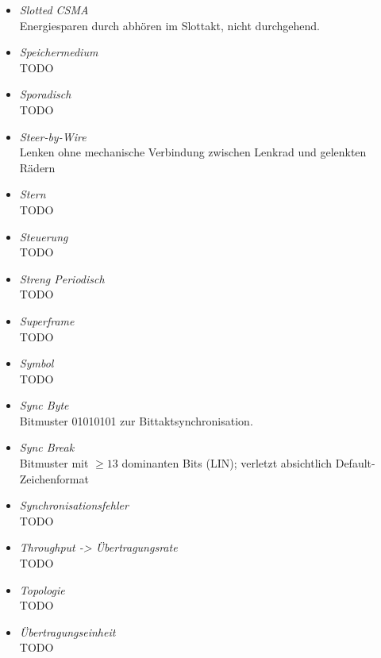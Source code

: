 \documentclass{article}
\begin{document}
\begin{itemize}
	\item \emph{Slotted CSMA}\\
		Energiesparen durch abhören im Slottakt, nicht durchgehend.

	\item \emph{Speichermedium}\\
		TODO

	\item \emph{Sporadisch}\\
		TODO

	\item \emph{Steer-by-Wire}\\
		Lenken ohne mechanische Verbindung zwischen Lenkrad und gelenkten Rädern
	
	\item \emph{Stern}\\
		TODO

	\item \emph{Steuerung}\\
		TODO

	\item \emph{Streng Periodisch}\\
		TODO

	\item \emph{Superframe}\\
		TODO

	\item \emph{Symbol}\\
		TODO

	\item \emph{Sync Byte}\\
		Bitmuster 01010101 zur Bittaktsynchronisation.

	\item \emph{Sync Break}\\
		Bitmuster mit $\geq 13$ dominanten Bits (LIN); verletzt absichtlich Default-Zeichenformat

	\item \emph{Synchronisationsfehler}\\
		TODO

	\item \emph{Throughput -> Übertragungsrate}\\
		TODO

	\item \emph{Topologie}\\
		TODO

	\item \emph{Übertragungseinheit}\\
		TODO


\end{itemize}
\end{document}
